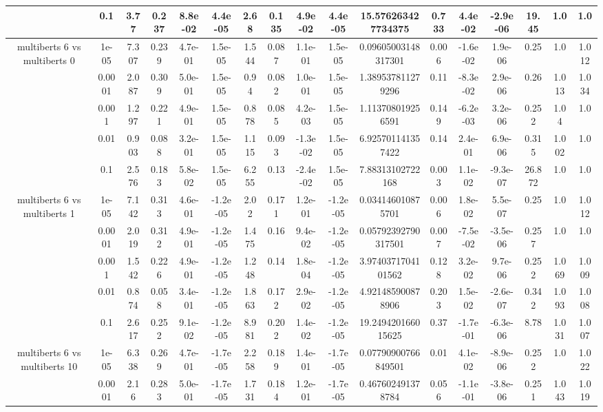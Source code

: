 \begin{tabular}{|c|c|c|c|c|c|c|c|c|c|c|c|c|c|c|c|c|}
 & 0.1 & 3.77 & 0.237 & 8.8e-02 & 4.4e-05 & 2.68 & 0.135 & 4.9e-02 & 4.4e-05 & 15.576263427734375 & 0.733 & 4.4e-02 & -2.9e-06 & 19.45 & 1.0 & 1.0 \\
\hline
\multirow{5}{*}{multiberts 6 vs multiberts 0} & 1e-05 & 7.307 & 0.239 & 4.7e-01 & 1.5e-05 & 1.544 & 0.087 & 1.1e-01 & 1.5e-05 & 0.09605003148317301 & 0.006 & -1.6e-02 & 1.9e-06 & 0.25 & 1.0 & 1.012 \\
 & 0.0001 & 2.087 & 0.309 & 5.0e-01 & 1.5e-05 & 0.94 & 0.082 & 1.0e-01 & 1.5e-05 & 1.389537811279296 & 0.11 & -8.3e-02 & 2.9e-06 & 0.26 & 1.013 & 1.034 \\
 & 0.001 & 1.297 & 0.221 & 4.9e-01 & 1.5e-05 & 0.878 & 0.085 & 4.2e-03 & 1.5e-05 & 1.113708019256591 & 0.149 & -6.2e-03 & 3.2e-06 & 0.252 & 1.04 & 1.0 \\
 & 0.01 & 0.903 & 0.088 & 3.2e-01 & 1.5e-05 & 1.115 & 0.093 & -1.3e-02 & 1.5e-05 & 6.925701141357422 & 0.14 & 2.4e-01 & 6.9e-06 & 0.315 & 1.002 & 1.0 \\
 & 0.1 & 2.576 & 0.183 & 5.8e-02 & 1.5e-05 & 6.255 & 0.13 & -2.4e-02 & 1.5e-05 & 7.88313102722168 & 0.003 & 1.1e-02 & -9.3e-07 & 26.872 & 1.0 & 1.0 \\
\hline
\multirow{5}{*}{multiberts 6 vs multiberts 1} & 1e-05 & 7.142 & 0.313 & 4.6e-01 & -1.2e-05 & 2.02 & 0.171 & 1.2e-01 & -1.2e-05 & 0.034146010875701 & 0.006 & 1.8e-02 & 5.5e-07 & 0.25 & 1.0 & 1.012 \\
 & 0.0001 & 2.019 & 0.312 & 4.9e-01 & -1.2e-05 & 1.475 & 0.16 & 9.4e-02 & -1.2e-05 & 0.05792392790317501 & 0.007 & -7.5e-02 & -3.5e-06 & 0.257 & 1.0 & 1.0 \\
 & 0.001 & 1.542 & 0.226 & 4.9e-01 & -1.2e-05 & 1.248 & 0.14 & 1.8e-04 & -1.2e-05 & 3.9740371704101562 & 0.128 & 3.2e-02 & 9.7e-06 & 0.252 & 1.069 & 1.009 \\
 & 0.01 & 0.874 & 0.058 & 3.4e-01 & -1.2e-05 & 1.863 & 0.172 & 2.9e-02 & -1.2e-05 & 4.921485900878906 & 0.203 & 1.5e-02 & -2.6e-07 & 0.342 & 1.093 & 1.008 \\
 & 0.1 & 2.617 & 0.252 & 9.1e-02 & -1.2e-05 & 8.981 & 0.202 & 1.4e-02 & -1.2e-05 & 19.249420166015625 & 0.37 & -1.7e-01 & -6.3e-06 & 8.78 & 1.031 & 1.007 \\
\hline
\multirow{5}{*}{multiberts 6 vs multiberts 10} & 1e-05 & 6.338 & 0.269 & 4.7e-01 & -1.7e-05 & 2.258 & 0.189 & 1.4e-01 & -1.7e-05 & 0.07790900766849501 & 0.01 & 4.1e-02 & -8.9e-06 & 0.252 & 1.0 & 1.022 \\
 & 0.0001 & 2.16 & 0.283 & 5.0e-01 & -1.7e-05 & 1.731 & 0.184 & 1.2e-01 & -1.7e-05 & 0.467602491378784 & 0.056 & -1.1e-01 & -3.8e-06 & 0.251 & 1.043 & 1.019 \\

\end{tabular}
